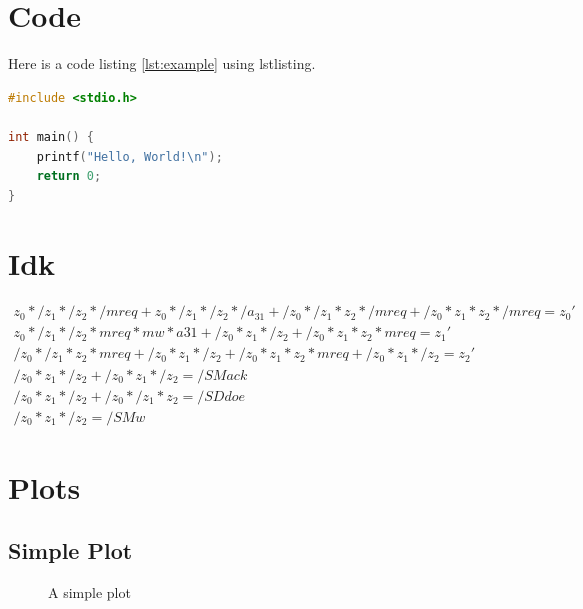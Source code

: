 \documentclass{scrartcl}
\begin{document}
\section{Code}
  Here is a code listing \ref{lst:example} using lstlisting.
  \begin{lstlisting}[language=C, caption={Example Code}, label=lst:example, breaklines=true, escapeinside='']
#include <stdio.h>

int main() {
    printf("Hello, World!\n");
    return 0;
}
\end{lstlisting}

\section{Idk}
  \begin{align*}
    z_0*/z_1*/z_2*/mreq + z_0*/z_1*/z_2*/a_{31} + /z_0*/z_1*z_2*/mreq + /z_0*z_1*z_2*/mreq = z_0' \\
    z_0*/z_1*/z_2*mreq*mw*a31 + /z_0*z_1*/z_2 + /z_0*z_1*z_2*mreq = z_1'                          \\
    /z_0*/z_1*z_2*mreq + /z_0*z_1*/z_2 + /z_0*z_1*z_2*mreq + /z_0*z_1*/z_2 = z_2'                 \\
    /z_0*z_1*/z_2+/z_0*z_1*/z_2 = /SMack                                                          \\
    /z_0*z_1*/z_2+/z_0*/z_1*z_2 = /SDdoe                                                          \\
    /z_0*z_1*/z_2 = /SMw
  \end{align*}

\section{Plots}
  \subsection{Simple Plot}
    \noindent
    \FloatBarrier
    \begin{figure}[ht]
      \centering
      \caption{A simple plot}
      \label{fig:simpleplot}
    \end{figure}
    \FloatBarrier
\end{document}
